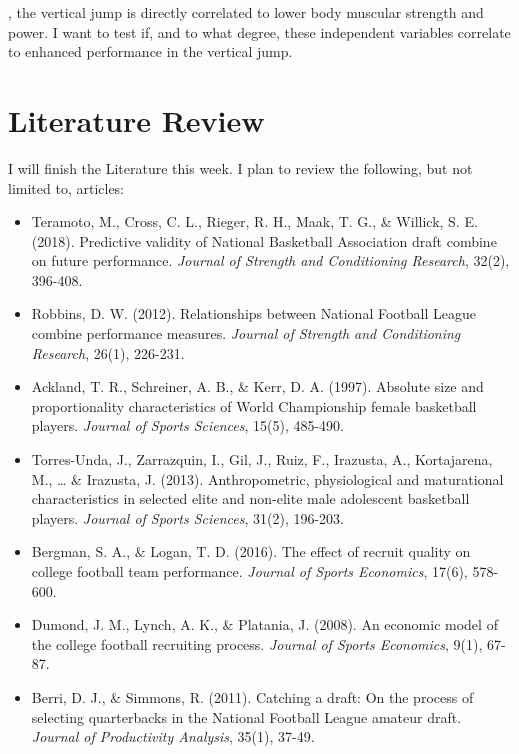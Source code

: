 \documentclass[12pt]{article}
\begin{document}
\parencite{baechle2008essentials}, the vertical jump is directly correlated to lower body muscular strength and power. I want to test if, and to what degree, these independent variables correlate to enhanced performance in the vertical jump.

\section*{Literature Review}
I will finish the Literature this week. I plan to review the following, but not limited to, articles:

\begin{itemize}
    \item Teramoto, M., Cross, C. L., Rieger, R. H., Maak, T. G., \& Willick, S. E. (2018). Predictive validity of National Basketball Association draft combine on future performance. \textit{Journal of Strength and Conditioning Research}, 32(2), 396-408.
    
    \item Robbins, D. W. (2012). Relationships between National Football League combine performance measures. \textit{Journal of Strength and Conditioning Research}, 26(1), 226-231.
    
    \item Ackland, T. R., Schreiner, A. B., \& Kerr, D. A. (1997). Absolute size and proportionality characteristics of World Championship female basketball players. \textit{Journal of Sports Sciences}, 15(5), 485-490.
    
    \item Torres-Unda, J., Zarrazquin, I., Gil, J., Ruiz, F., Irazusta, A., Kortajarena, M., \ldots{} \& Irazusta, J. (2013). Anthropometric, physiological and maturational characteristics in selected elite and non-elite male adolescent basketball players. \textit{Journal of Sports Sciences}, 31(2), 196-203.
    
    \item Bergman, S. A., \& Logan, T. D. (2016). The effect of recruit quality on college football team performance. \textit{Journal of Sports Economics}, 17(6), 578-600.
    
    \item Dumond, J. M., Lynch, A. K., \& Platania, J. (2008). An economic model of the college football recruiting process. \textit{Journal of Sports Economics}, 9(1), 67-87.
    
    \item Berri, D. J., \& Simmons, R. (2011). Catching a draft: On the process of selecting quarterbacks in the National Football League amateur draft. \textit{Journal of Productivity Analysis}, 35(1), 37-49.
\end{itemize}
\end{document}
